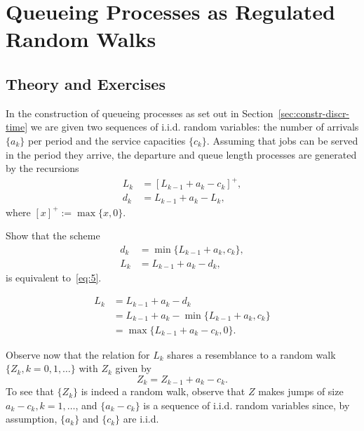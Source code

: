 \section{Queueing Processes as Regulated Random Walks}
\label{sec:queu-proc-as}

\subsection*{Theory and Exercises}




In the construction of queueing processes as set out in
Section~\ref{sec:constr-discr-time} we are given two sequences of
i.i.d. random variables: the number of arrivals $\{a_k\}$ per period
and the service capacities $\{c_k\}$. Assuming that jobs can be served
in the period they arrive, the departure and queue length processes
are generated by the recursions
\begin{equation}\label{eq:5}
  \begin{split}
  L_k &= [L_{k-1}+a_k - c_k]^+,\\
  d_k &= L_{k-1} +a_k- L_{k},
  \end{split}
\end{equation}
where $[x]^+ := \max\{x, 0\}$.  

\begin{exercise}[\faFlask]\label{ex:24}
  Show that the scheme
  \begin{align*}
    d_k &= \min\{L_{k-1}+a_k, c_k\}, \\
    L_k &= L_{k-1} + a_k - d_k,
  \end{align*}
  is equivalent to~\eqref{eq:5}. 
\begin{solution}
  \begin{align*}
    L_k &= L_{k-1} + a_k - d_k \\ 
        &= L_{k-1} + a_k - \min\{L_{k-1}+a_k, c_k\} \\
        &= \max\{L_{k-1} + a_k - c_k, 0 \}.
  \end{align*}
\end{solution}
\end{exercise}


Observe now that the relation for $L_k$ shares a resemblance to a random walk $\{Z_k, k=0,1,\ldots\}$ with  $Z_k$ given by
\begin{equation}\label{eq:44}
  Z_k = Z_{k-1} + a_k - c_k.
\end{equation}
To see that $\{Z_k\}$ is indeed a random walk, observe that $Z$ makes  jumps of size $a_k-c_k, k=1,\ldots$, and $\{a_k-c_k\}$ is a sequence of i.i.d. random variables since, by assumption,  $\{a_k\}$ and $\{c_k\}$ are i.i.d.

